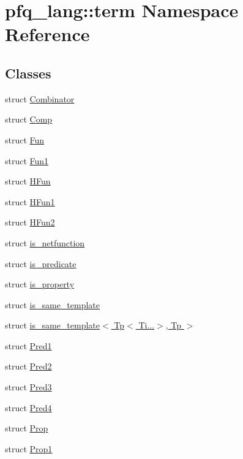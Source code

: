\hypertarget{namespacepfq__lang_1_1term}{\section{pfq\+\_\+lang\+:\+:term Namespace Reference}
\label{namespacepfq__lang_1_1term}
}
\subsection*{Classes}
\begin{DoxyCompactItemize}
\item 
struct \hyperlink{structpfq__lang_1_1term_1_1Combinator}{Combinator}
\item 
struct \hyperlink{structpfq__lang_1_1term_1_1Comp}{Comp}
\item 
struct \hyperlink{structpfq__lang_1_1term_1_1Fun}{Fun}
\item 
struct \hyperlink{structpfq__lang_1_1term_1_1Fun1}{Fun1}
\item 
struct \hyperlink{structpfq__lang_1_1term_1_1HFun}{H\+Fun}
\item 
struct \hyperlink{structpfq__lang_1_1term_1_1HFun1}{H\+Fun1}
\item 
struct \hyperlink{structpfq__lang_1_1term_1_1HFun2}{H\+Fun2}
\item 
struct \hyperlink{structpfq__lang_1_1term_1_1is__netfunction}{is\+\_\+netfunction}
\item 
struct \hyperlink{structpfq__lang_1_1term_1_1is__predicate}{is\+\_\+predicate}
\item 
struct \hyperlink{structpfq__lang_1_1term_1_1is__property}{is\+\_\+property}
\item 
struct \hyperlink{structpfq__lang_1_1term_1_1is__same__template}{is\+\_\+same\+\_\+template}
\item 
struct \hyperlink{structpfq__lang_1_1term_1_1is__same__template_3_01Tp_3_01Ti_8_8_8_4_00_01Tp_01_4}{is\+\_\+same\+\_\+template$<$ Tp$<$ Ti...$>$, Tp $>$}
\item 
struct \hyperlink{structpfq__lang_1_1term_1_1Pred1}{Pred1}
\item 
struct \hyperlink{structpfq__lang_1_1term_1_1Pred2}{Pred2}
\item 
struct \hyperlink{structpfq__lang_1_1term_1_1Pred3}{Pred3}
\item 
struct \hyperlink{structpfq__lang_1_1term_1_1Pred4}{Pred4}
\item 
struct \hyperlink{structpfq__lang_1_1term_1_1Prop}{Prop}
\item 
struct \hyperlink{structpfq__lang_1_1term_1_1Prop1}{Prop1}
\end{DoxyCompactItemize}
